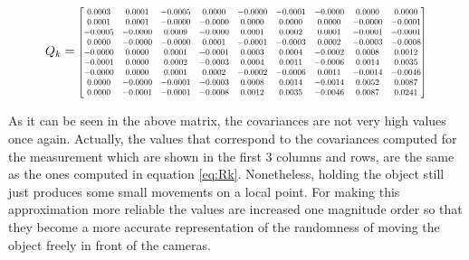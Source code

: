 \begin{equation}
Q_{k}=
\resizebox{.8 \textwidth}{!}{$
\begin{bmatrix}
0.0003 & 0.0001 & -0.0005 & 0.0000 & -0.0000 & -0.0001 & -0.0000 & 0.0000 & 0.0000 \\
0.0001 & 0.0001 & -0.0000 & -0.0000 & 0.0000 & 0.0000 & 0.0000 & -0.0000 & -0.0001 \\
-0.0005 & -0.0000 & 0.0009 & -0.0000 & 0.0001 & 0.0002 & 0.0001 & -0.0001 & -0.0001 \\
0.0000 & -0.0000 & -0.0000 & 0.0001 & -0.0001 & -0.0003 & 0.0002 & -0.0003 & -0.0008 \\
-0.0000 & 0.0000 & 0.0001 & -0.0001 & 0.0003 & 0.0004 & -0.0002 & 0.0008 & 0.0012 \\
-0.0001 & 0.0000 & 0.0002 & -0.0003 & 0.0004 & 0.0011 & -0.0006 & 0.0014 & 0.0035 \\
-0.0000 & 0.0000 & 0.0001 & 0.0002 & -0.0002 & -0.0006 & 0.0011 & -0.0014 & -0.0046 \\
0.0000 & -0.0000 & -0.0001 & -0.0003 & 0.0008 & 0.0014 & -0.0014 & 0.0052 & 0.0087 \\
0.0000 & -0.0001 & -0.0001 & -0.0008 & 0.0012 & 0.0035 & -0.0046 & 0.0087 & 0.0241 \\
\end{bmatrix}$}
\label{eq:Qk}
\end{equation}

As it can be seen in the above matrix, the covariances are not very high values once again. Actually, the values that correspond to the covariances computed for the measurement which are shown in the first 3 columns and rows, are the same as the ones computed in equation \ref{eq:Rk}. Nonetheless, holding the object still just produces some small movements on a local point. For making this approximation more reliable the values are increased one magnitude order so that they become a more accurate representation of the randomness of moving the object freely in front of the cameras.

